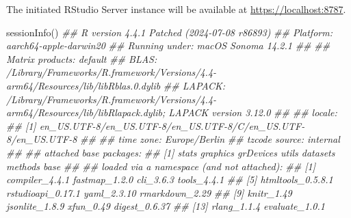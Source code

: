 \documentclass[
  letterpaper,
  DIV=11,
  numbers=noendperiod]{scrreprt}
\newenvironment{Shaded}{\begin{snugshade}}{\end{snugshade}}
\newcommand{\DocumentationTok}[1]{\textcolor[rgb]{0.37,0.37,0.37}{\textit{#1}}}
\newcommand{\FunctionTok}[1]{\textcolor[rgb]{0.28,0.35,0.67}{#1}}
\newcommand{\NormalTok}[1]{\textcolor[rgb]{0.00,0.23,0.31}{#1}}
\begin{document}
The initiated RStudio Server instance will be available at
\url{https://localhost:8787}.

\begin{tcolorbox}[enhanced jigsaw, opacityback=0, toprule=.15mm, bottomtitle=1mm, rightrule=.15mm, breakable, bottomrule=.15mm, colframe=quarto-callout-note-color-frame, colback=white, coltitle=black, left=2mm, titlerule=0mm, title=\textcolor{quarto-callout-note-color}{\faInfo}\hspace{0.5em}{Session info}, toptitle=1mm, arc=.35mm, colbacktitle=quarto-callout-note-color!10!white, leftrule=.75mm, opacitybacktitle=0.6]

\begin{Shaded}
\begin{Highlighting}[]
\FunctionTok{sessionInfo}\NormalTok{()}
\DocumentationTok{\#\#  R version 4.4.1 Patched (2024{-}07{-}08 r86893)}
\DocumentationTok{\#\#  Platform: aarch64{-}apple{-}darwin20}
\DocumentationTok{\#\#  Running under: macOS Sonoma 14.2.1}
\DocumentationTok{\#\#  }
\DocumentationTok{\#\#  Matrix products: default}
\DocumentationTok{\#\#  BLAS:   /Library/Frameworks/R.framework/Versions/4.4{-}arm64/Resources/lib/libRblas.0.dylib }
\DocumentationTok{\#\#  LAPACK: /Library/Frameworks/R.framework/Versions/4.4{-}arm64/Resources/lib/libRlapack.dylib;  LAPACK version 3.12.0}
\DocumentationTok{\#\#  }
\DocumentationTok{\#\#  locale:}
\DocumentationTok{\#\#  [1] en\_US.UTF{-}8/en\_US.UTF{-}8/en\_US.UTF{-}8/C/en\_US.UTF{-}8/en\_US.UTF{-}8}
\DocumentationTok{\#\#  }
\DocumentationTok{\#\#  time zone: Europe/Berlin}
\DocumentationTok{\#\#  tzcode source: internal}
\DocumentationTok{\#\#  }
\DocumentationTok{\#\#  attached base packages:}
\DocumentationTok{\#\#  [1] stats     graphics  grDevices utils     datasets  methods   base     }
\DocumentationTok{\#\#  }
\DocumentationTok{\#\#  loaded via a namespace (and not attached):}
\DocumentationTok{\#\#   [1] compiler\_4.4.1    fastmap\_1.2.0     cli\_3.6.3         tools\_4.4.1      }
\DocumentationTok{\#\#   [5] htmltools\_0.5.8.1 rstudioapi\_0.17.1 yaml\_2.3.10       rmarkdown\_2.29   }
\DocumentationTok{\#\#   [9] knitr\_1.49        jsonlite\_1.8.9    xfun\_0.49         digest\_0.6.37    }
\DocumentationTok{\#\#  [13] rlang\_1.1.4       evaluate\_1.0.1}
\end{Highlighting}
\end{Shaded}

\end{tcolorbox}

\end{document}
